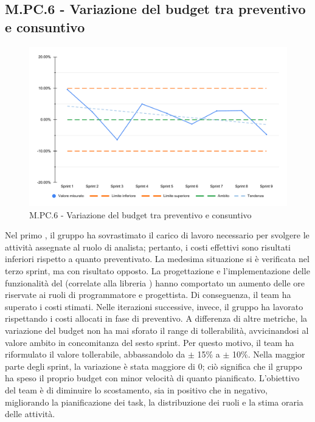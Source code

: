 \subsection{M.PC.6 - Variazione del budget tra preventivo e consuntivo}
\begin{figure}[H]
    \centering
    \includegraphics[width=\textwidth]{assets/variazione_budget.pdf}
    \caption{M.PC.6 - Variazione del budget tra preventivo e consuntivo}
\end{figure}

\par Nel primo , il gruppo ha sovrastimato il carico di lavoro necessario per svolgere le attività assegnate al ruolo di analista; pertanto, i costi effettivi sono risultati inferiori rispetto a quanto preventivato. La medesima situazione si è verificata nel terzo sprint, ma con risultato opposto. La progettazione e l’implementazione delle funzionalità del  (correlate alla libreria ) hanno comportato un aumento delle ore riservate ai ruoli di programmatore e progettista. Di conseguenza, il team ha superato i costi stimati. Nelle iterazioni successive, invece, il gruppo ha lavorato rispettando i costi allocati in fase di preventivo. A differenza di altre metriche, la variazione del budget non ha mai sforato il range di tollerabilità, avvicinandosi al valore ambito in concomitanza del sesto sprint. Per questo motivo, il team ha riformulato il valore tollerabile, abbassandolo da $\pm$ 15\% a $\pm$ 10\%. Nella maggior parte degli sprint, la variazione è stata maggiore di 0; ciò significa che il gruppo ha speso il proprio budget con minor velocità di quanto pianificato. L’obiettivo del team è di diminuire lo scostamento, sia in positivo che in negativo, migliorando la pianificazione dei task, la distribuzione dei ruoli e la stima oraria delle attività.
